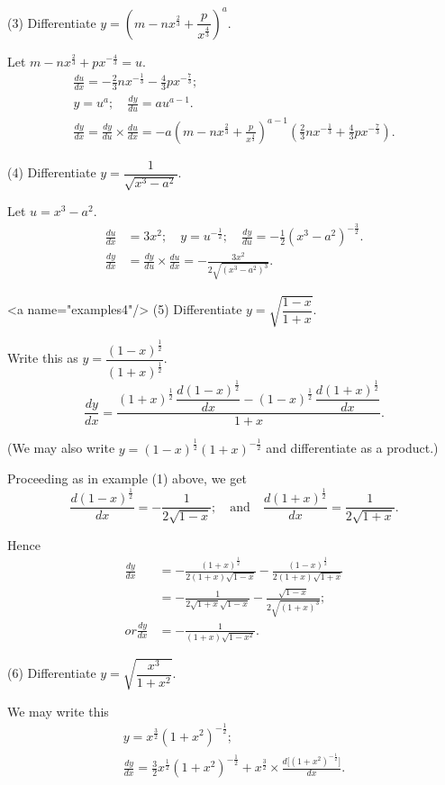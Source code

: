 \documentclass{ximera}
\begin{document}
(3) Differentiate $y = \left(m - nx^{\frac{2}{3}} + \dfrac{p}{x^{\frac{4}{3}}}\right)^a$.

Let $m - nx^{\frac{2}{3}} + px^{-\frac{4}{3}} = u$.
\begin{gather*}
\frac{du}{dx} = -\tfrac{2}{3} nx^{-\frac{1}{3}} - \tfrac{4}{3} px^{-\frac{7}{3}};\\
y = u^a;\quad \frac{dy}{du} = a u^{a-1}. \\
\frac{dy}{dx} = \frac{dy}{du}\times\frac{du}{dx}
  = -a\left(m -nx^{\frac{2}{3}} + \frac{p}{x^{\frac{4}{3}}}\right)^{a-1}
     (\tfrac{2}{3} nx^{-\frac{1}{3}} + \tfrac{4}{3} px^{-\frac{7}{3}}).
\end{gather*}

(4) Differentiate $y=\dfrac{1}{\sqrt{x^3 - a^2}}$.

Let $u = x^3 - a^2$.
\begin{align*}
\frac{du}{dx} &= 3x^2;\quad y = u^{-\frac{1}{2}};\quad
  \frac{dy}{du}=-\frac{1}{2}(x^3 - a^2)^{-\frac{3}{2}}. \\
\frac{dy}{dx} &= \frac{dy}{du} \times \frac{du}{dx} = -\frac{3x^2}{2\sqrt{(x^3 - a^2)^3}}.
\end{align*}

<a name="examples4"/>
(5) Differentiate $y=\sqrt{\dfrac{1-x}{1+x}}$.

Write this as $y=\dfrac{(1-x)^{\frac{1}{2}}}{(1+x)^{\frac{1}{2}}}$.
\[
\frac{dy}{dx}
  = \frac{(1+x)^{\frac{1}{2}}\, \dfrac{d(1-x)^{\frac{1}{2}}}{dx}
        - (1-x)^{\frac{1}{2}}\, \dfrac{d(1+x)^{\frac{1}{2}}}{dx}}{1+x}.
\]

(We may also write $y = (1-x)^{\frac{1}{2}} (1+x)^{-\frac{1}{2}}$ and differentiate
as a product.)


Proceeding as in example (1) above, we get
\[
\frac{d(1-x)^{\frac{1}{2}}}{dx} = -\frac{1}{2\sqrt{1-x}};
\quad\text{and}\quad
\frac{d(1+x)^{\frac{1}{2}}}{dx} = \frac{1}{2\sqrt{1+x}}.
\]

Hence
\begin{align*}
\frac{dy}{dx}
  &= - \frac{(1 + x)^{\frac{1}{2}}}{2(1 + x)\sqrt{1-x}}
     - \frac{(1 - x)^{\frac{1}{2}}}{2(1 + x)\sqrt{1+x}} \\
  &= - \frac{1}{2\sqrt{1+x}\sqrt{1-x}} - \frac{\sqrt{1-x}}{2 \sqrt{(1+x)^3}};\\
 or
\frac{dy}{dx}
  &= - \frac{1}{(1+x)\sqrt{1-x^2}}.
\end{align*}

(6) Differentiate $y = \sqrt{\dfrac{x^3}{1+x^2}}$.

We may write this
\begin{gather*}
y = x^{\frac{3}{2}}(1+x^2)^{-\frac{1}{2}}; \\
\frac{dy}{dx}
  = \tfrac{3}{2} x^{\frac{1}{2}}(1 + x^2)^{-\frac{1}{2}}
  + x^{\frac{3}{2}} \times \frac{d\bigl[(1+x^2)^{-\frac{1}{2}}\bigr]}{dx}.
\end{gather*}
\end{document}
